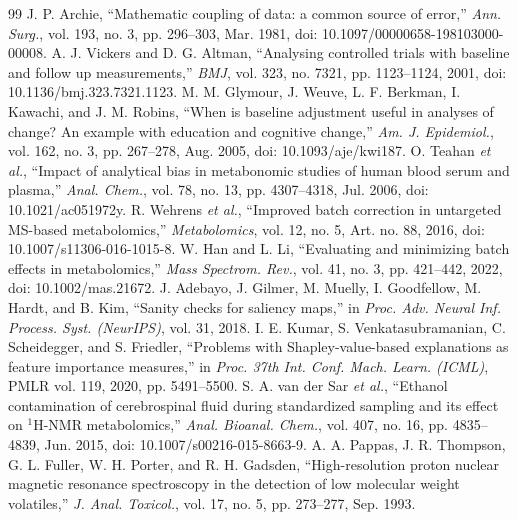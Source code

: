 \begin{thebibliography}{99}
 J. P. Archie, ``Mathematic coupling of data: a common source of error,'' \textit{Ann. Surg.}, vol. 193, no. 3, pp. 296--303, Mar. 1981, doi: 10.1097/00000658-198103000-00008.
 A. J. Vickers and D. G. Altman, ``Analysing controlled trials with baseline and follow up measurements,'' \textit{BMJ}, vol. 323, no. 7321, pp. 1123--1124, 2001, doi: 10.1136/bmj.323.7321.1123.
 M. M. Glymour, J. Weuve, L. F. Berkman, I. Kawachi, and J. M. Robins, ``When is baseline adjustment useful in analyses of change? An example with education and cognitive change,'' \textit{Am. J. Epidemiol.}, vol. 162, no. 3, pp. 267--278, Aug. 2005, doi: 10.1093/aje/kwi187.
 O. Teahan \textit{et al.}, ``Impact of analytical bias in metabonomic studies of human blood serum and plasma,'' \textit{Anal. Chem.}, vol. 78, no. 13, pp. 4307--4318, Jul. 2006, doi: 10.1021/ac051972y.
 R. Wehrens \textit{et al.}, ``Improved batch correction in untargeted MS-based metabolomics,'' \textit{Metabolomics}, vol. 12, no. 5, Art. no. 88, 2016, doi: 10.1007/s11306-016-1015-8.
 W. Han and L. Li, ``Evaluating and minimizing batch effects in metabolomics,'' \textit{Mass Spectrom. Rev.}, vol. 41, no. 3, pp. 421--442, 2022, doi: 10.1002/mas.21672.
 J. Adebayo, J. Gilmer, M. Muelly, I. Goodfellow, M. Hardt, and B. Kim, ``Sanity checks for saliency maps,'' in \textit{Proc. Adv. Neural Inf. Process. Syst. (NeurIPS)}, vol. 31, 2018.
 I. E. Kumar, S. Venkatasubramanian, C. Scheidegger, and S. Friedler, ``Problems with Shapley-value-based explanations as feature importance measures,'' in \textit{Proc. 37th Int. Conf. Mach. Learn. (ICML)}, PMLR vol. 119, 2020, pp. 5491--5500.
 S. A. van der Sar \textit{et al.}, ``Ethanol contamination of cerebrospinal fluid during standardized sampling and its effect on $^1$H-NMR metabolomics,'' \textit{Anal. Bioanal. Chem.}, vol. 407, no. 16, pp. 4835--4839, Jun. 2015, doi: 10.1007/s00216-015-8663-9.
 A. A. Pappas, J. R. Thompson, G. L. Fuller, W. H. Porter, and R. H. Gadsden, ``High-resolution proton nuclear magnetic resonance spectroscopy in the detection of low molecular weight volatiles,'' \textit{J. Anal. Toxicol.}, vol. 17, no. 5, pp. 273--277, Sep. 1993.

\end{thebibliography}
